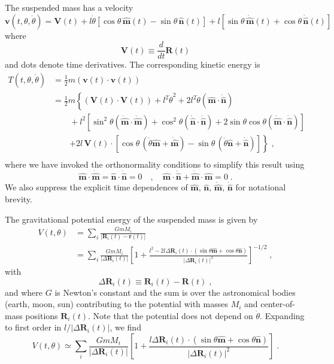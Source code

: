 \documentclass[12pt]{article}
\providecommand{\vecsymbol}[1]{\ensuremath{\boldsymbol{#1}}}
\providecommand{\rv}{\vecsymbol{r}}
\providecommand{\Rv}{\vecsymbol{R}}
\providecommand{\vv}{\vecsymbol{v}}
\providecommand{\Vv}{\vecsymbol{V}}
\providecommand{\mv}{\hat{\vecsymbol{m}}}
\providecommand{\nv}{\hat{\vecsymbol{n}}}
\providecommand{\thdot}{\dot{\theta}}
\begin{document}
The suspended mass has a velocity
\begin{equation}
\vv(t,\theta,\thdot) = \Vv(t) + l\thdot \left[ \cos\theta\,\mv(t) - \sin\theta\,\nv(t) \right]
+ l \left[ \sin\theta\,\dot{\mv}(t) + \cos\theta\,\dot{\nv}(t) \right]
\end{equation}
where
\begin{equation}
\Vv(t) \equiv \frac{d}{dt}\Rv(t)
\end{equation}
and dots denote time derivatives. The corresponding kinetic energy is
\begin{equation}
\begin{split}
T(t,\theta,\thdot) &= \frac{1}{2} m \left( \vv(t)\cdot \vv(t) \right) \\
&= \frac{1}{2} m \left\{ (\Vv(t)\cdot\Vv(t)) + l^2\thdot^2 + 2l^2\thdot (\mv\cdot\dot{\nv}) \right. \\
&\qquad + l^2 \left[\sin^2\theta (\dot{\mv}\cdot\dot{\mv}) + \cos^2\theta (\dot{\nv}\cdot\dot{\nv}) +
2 \sin\theta\cos\theta (\dot{\mv}\cdot\dot{\nv}) \right] \\
&\qquad \left. +2 l\,\Vv(t)\cdot\left[ \cos\theta\,(\thdot \mv+\dot{\mv}) -
\sin\theta\,(\thdot \nv+\dot{\nv})\right] \right\} \; , \\ 
\end{split}
\end{equation}
where we have invoked the orthonormality conditions to simplify this result using
\begin{equation}
\mv\cdot\dot{\mv} = \nv\cdot\dot{\nv} = 0 \quad , \quad
\mv\cdot\dot{\nv} + \dot{\mv}\cdot\mv = 0 \; .
\end{equation}
We also suppress the explicit time dependences of $\mv$, $\nv$, $\dot{\mv}$, $\dot{\nv}$ for notational brevity.

The gravitational potential energy of the suspended mass is given by
\begin{equation}
\begin{split}
V(t,\theta) &= \sum_i \frac{G m M_i}{\left| \Rv_i(t) - \rv(t) \right|} \\
&= \sum_i \frac{G m M_i}{\left|\Delta\Rv_i(t)\right|} \left[
1 + \frac{l^2 - 2 l \Delta\Rv_i(t)\cdot(\sin\theta \mv + \cos\theta \nv)}{\left|\Delta\Rv_i(t)\right|^2}
\right]^{-1/2} \; ,
\end{split}
\end{equation}
with
\begin{equation}
\Delta\Rv_i(t) \equiv \Rv_i(t)-\Rv(t) \; ,
\end{equation}
and where $G$ is Newton's constant and the sum is over the astronomical bodies (earth, moon, sun) contributing to the potential with masses $M_i$ and center-of-mass positions $\Rv_i(t)$. Note that the potential does not depend on $\thdot$. Expanding to first order in $l/|\Delta\Rv_i(t)|$, we find
\begin{equation}
V(t,\theta) \simeq \sum_i \frac{G m M_i}{\left|\Delta\Rv_i(t)\right|} \left[1 +
\frac{l \Delta\Rv_i(t)\cdot(\sin\theta \mv + \cos\theta \nv)}{\left|\Delta\Rv_i(t)\right|^2}\right] \; .
\end{equation}
\end{document}
